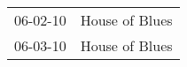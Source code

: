 \begin{supertabular}{p{0.07\textwidth}p{0.23\textwidth}}
 06-02-10 &  House of Blues \\
 06-03-10 &  House of Blues \\
\end{supertabular}
